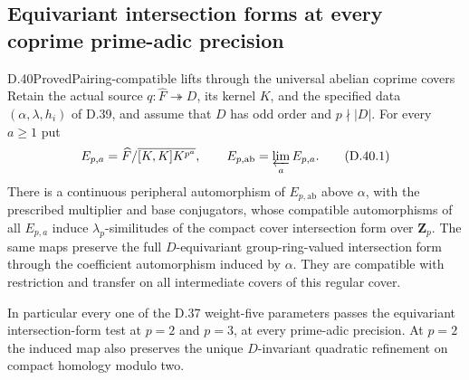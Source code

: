 \subsection{Equivariant intersection forms at every coprime prime-adic precision}

\begin{statement}{D.40}{Proved}{Pairing-compatible lifts through the universal abelian coprime covers}
Retain the actual source \(q:\widehat F\twoheadrightarrow D\),
its kernel \(K\), and the specified data
\((\alpha,\lambda,h_i)\) of D.39, and assume that \(D\)
has odd order and \(p\nmid |D|\).
For every \(a\geq1\) put
\[
 E_{p,a}=
 \widehat F/\overline{[K,K]K^{p^a}},\qquad
 E_{p,\mathrm{ab}}=\varprojlim_a E_{p,a}.
 \tag{D.40.1}
\]
There is a continuous peripheral automorphism of
\(E_{p,\mathrm{ab}}\) above \(\alpha\), with the prescribed
multiplier and base conjugators, whose compatible
automorphisms of all \(E_{p,a}\) induce
\(\lambda_p\)-similitudes of the compact cover intersection
form over \(\mathbf Z_p\).
The same maps preserve the full \(D\)-equivariant
group-ring-valued intersection form through
the coefficient automorphism induced by \(\alpha\).
They are compatible with restriction and transfer
on all intermediate covers of this regular cover.

In particular every one of the D.37 weight-five
parameters passes the equivariant intersection-form
test at \(p=2\) and \(p=3\), at every prime-adic
precision.  At \(p=2\) the induced map also preserves
the unique \(D\)-invariant quadratic refinement on
compact homology modulo two.
\end{statement}

